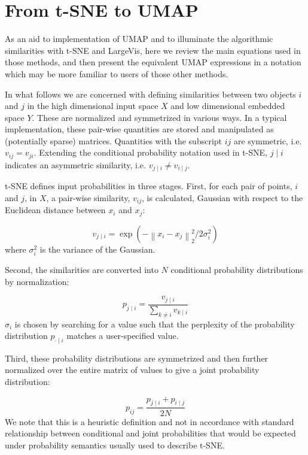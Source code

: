 \documentclass[12pt]{article}
\begin{document}
\section{From t-SNE to UMAP}\label{compare}

As an aid to implementation of UMAP and to illuminate the algorithmic similarities with t-SNE and LargeVis, here we review the main equations used in those methods, and then present the equivalent UMAP expressions in a notation which may be more familiar to users of those other methods.

In what follows we are concerned with defining similarities between two objects $i$ and $j$ in the high dimensional input space $X$ and low dimensional embedded space $Y$. These are normalized and symmetrized in various ways. In a typical implementation, these pair-wise quantities are stored and manipulated as (potentially sparse) matrices. Quantities with the subscript $ij$ are symmetric, i.e. $v_{ij} = v_{ji}$. Extending the conditional probability notation used in t-SNE, $j \mid i$ indicates an asymmetric similarity, i.e. $v_{j \mid i} \neq v_{i \mid j}$.

t-SNE defines input probabilities in three stages. First, for each pair of points, $i$ and $j$, in $X$, a pair-wise similarity, $v_{ij}$, is calculated, Gaussian with respect to the Euclidean distance between $x_i$ and $x_j$:

\begin{equation}\label{sim_tsne}
    v_{j \mid i} = \exp(-\left\lVert x_i - x_j \right\rVert_2^2 / 2 \sigma_{i}^2)
\end{equation}
where $\sigma_{i}^2$ is the variance of the Gaussian.

Second, the similarities are converted into $N$ conditional probability distributions by normalization:

\begin{equation}\label{prob_tsne}
    p_{j \mid i} = \frac{v_{j \mid i}}{\sum_{k \neq i} v_{k \mid i}} 
\end{equation}
$\sigma_{i}$ is chosen by searching for a value such that the perplexity of the probability distribution $p_{\cdot \mid i}$ matches a user-specified value.

Third, these probability distributions are symmetrized and then further normalized over the entire matrix of values to give a joint probability distribution:

\begin{equation}\label{matrix_norm_tsne}
    p_{ij} = \frac{p_{j \mid i} + p_{i \mid j}}{2N} 
\end{equation}
We note that this is a heuristic definition and not in accordance with standard relationship between conditional and joint probabilities that would be expected under probability semantics usually used to describe t-SNE.
\end{document}
